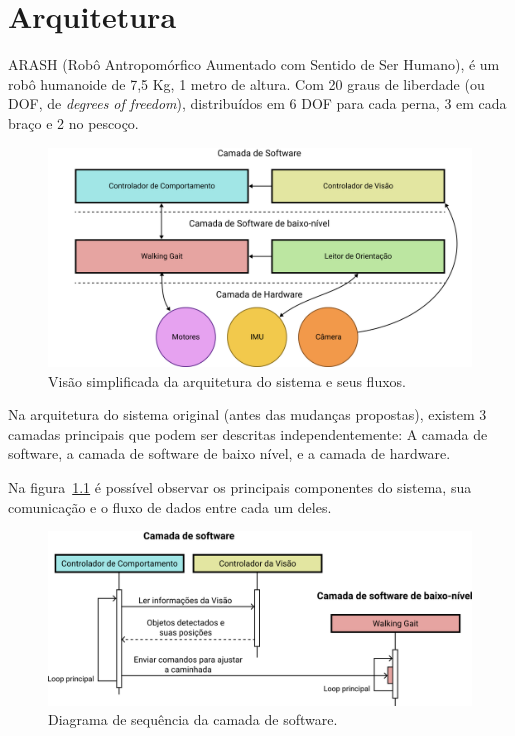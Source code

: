 \chapter{Arquitetura}

ARASH (Robô Antropomórfico Aumentado com Sentido de Ser Humano), é um robô humanoide de 7,5 Kg, 1 metro de altura. Com 20 graus de liberdade (ou DOF, de \textit{degrees of freedom}), distribuídos em 6 DOF para cada perna, 3 em cada braço e 2 no pescoço.

\begin{figure}[htb]
	\centering
	\includegraphics[scale=1]{imagens/svg/softwarearchitecture-flow}
	\caption{Visão simplificada da arquitetura do sistema e seus fluxos.}
	\label{fig:SoftwareArchitecture:SimplifiedOverview}
\end{figure}

Na arquitetura do sistema original (antes das mudanças propostas), existem 3 camadas principais que podem ser descritas independentemente: A camada de software, a camada de software de baixo nível, e a camada de hardware.

Na figura~\ref{fig:SoftwareArchitecture:SimplifiedOverview} é possível observar os principais componentes do sistema, sua comunicação e o fluxo de dados entre cada um deles.

\begin{figure}[htb]
	\centering
	\includegraphics[scale=1]{imagens/svg/softwarearchitecture-software}
	\caption{Diagrama de sequência da camada de software.}
	\label{fig:SoftwareArchitecture:Software}
\end{figure}

